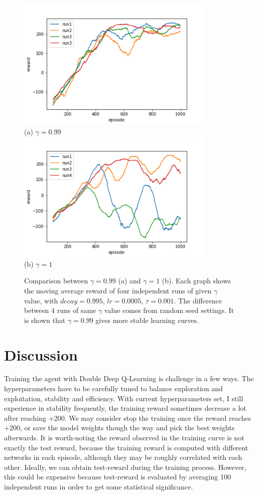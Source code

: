 \documentclass[conference]{IEEEtran}
\begin{document}
\begin{figure}
	\includegraphics[height=2.5in]{figures/gamma099.png}  \\ 
	\centering (a) $\gamma=0.99$\\
	\includegraphics[height=2.5in]{figures/gamma1.png}  \\ 
	\centering (b)  $\gamma=1$
	\caption{Comparison between $\gamma=0.99$ (a) and $\gamma=1$ (b). Each graph shows the moving average reward of four independent runs of given $\gamma$ value, with $decay=0.995$, $lr=0.0005$, $\tau=0.001$. The difference between 4 runs of same $\gamma$ value comes from random seed settings. It is shown that $\gamma=0.99$ gives more stable learning curves.}
	\label{fig:gamma}
\end{figure}
	
\section{Discussion}
Training the agent with Double Deep Q-Learning is challenge in a few ways. The hyperparameters have to be carefully tuned to balance exploration and exploitation, stability and efficiency. With current hyperparameters set, I still experience in stability frequently, the training reward sometimes decrease a lot after reaching +200. We may consider stop the training once the reward reaches +200, or save the model weights though the way and pick the best weights afterwards. It is worth-noting the reward observed in the training curve is not exactly the test reward, because the training reward is computed with different networks in each episode, although they may be roughly correlated with each other. Ideally, we can obtain test-reward during the training process. However, this could be expensive because test-reward is evaluated by averaging 100 independent runs in order to get some statistical significance.
\end{document}
